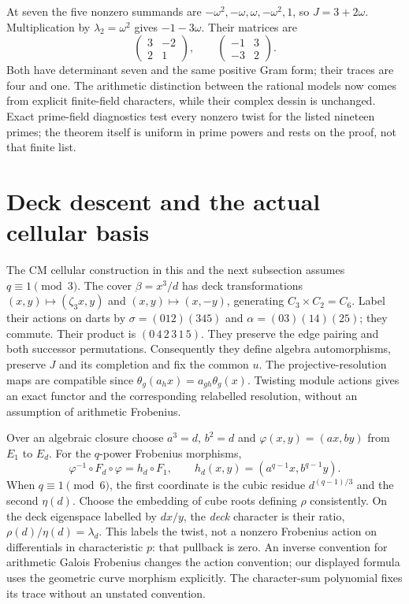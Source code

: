 \documentclass[11pt,oneside,openany]{book}
\theoremstyle{definition}\newtheorem{definition}[theorem]{Definition}
\theoremstyle{remark}\newtheorem{remark}[theorem]{Remark}
\begin{document}
At seven the five nonzero summands are $-\omega^2,-\omega,\omega,-\omega^2,1$, so $J=3+2\omega$. Multiplication by $\lambda_2=\omega^2$ gives $-1-3\omega$. Their matrices are
\[
 \begin{pmatrix}3&-2\\2&1\end{pmatrix},\qquad
 \begin{pmatrix}-1&3\\-3&2\end{pmatrix}.
\]
Both have determinant seven and the same positive Gram form; their traces are four and one. The arithmetic distinction between the rational models now comes from explicit finite-field characters, while their complex dessin is unchanged. Exact prime-field diagnostics test every nonzero twist for the listed nineteen primes; the theorem itself is uniform in prime powers and rests on the proof, not that finite list.

\section{Deck descent and the actual cellular basis}
The CM cellular construction in this and the next subsection assumes $q\equiv1\pmod3$.
The cover $\beta=x^3/d$ has deck transformations $(x,y)\mapsto(\zeta_3x,y)$ and $(x,y)\mapsto(x,-y)$, generating $C_3\times C_2=C_6$. Label their actions on darts by $\sigma=(012)(345)$ and $\alpha=(03)(14)(25)$; they commute. Their product is $(0\,4\,2\,3\,1\,5)$. They preserve the edge pairing and both successor permutations. Consequently they define algebra automorphisms, preserve $J$ and its completion and fix the common $u$. The projective-resolution maps are compatible since $\theta_g(a_hx)=a_{gh}\theta_g(x)$. Twisting module actions gives an exact functor and the corresponding relabelled resolution, without an assumption of arithmetic Frobenius.

Over an algebraic closure choose $a^3=d$, $b^2=d$ and $\varphi(x,y)=(ax,by)$ from $E_1$ to $E_d$. For the $q$-power Frobenius morphisms,
\[
 \varphi^{-1}\circ F_d\circ\varphi=h_d\circ F_1,\qquad
 h_d(x,y)=(a^{q-1}x,b^{q-1}y).
\]
When $q\equiv1\pmod6$, the first coordinate is the cubic residue $d^{(q-1)/3}$ and the second $\eta(d)$. Choose the embedding of cube roots defining $\rho$ consistently. On the deck eigenspace labelled by $dx/y$, the \emph{deck} character is their ratio, $\rho(d)/\eta(d)=\lambda_d$. This labels the twist, not a nonzero Frobenius action on differentials in characteristic $p$: that pullback is zero. An inverse convention for arithmetic Galois Frobenius changes the action convention; our displayed formula uses the geometric curve morphism explicitly. The character-sum polynomial fixes its trace without an unstated convention.
\end{document}
